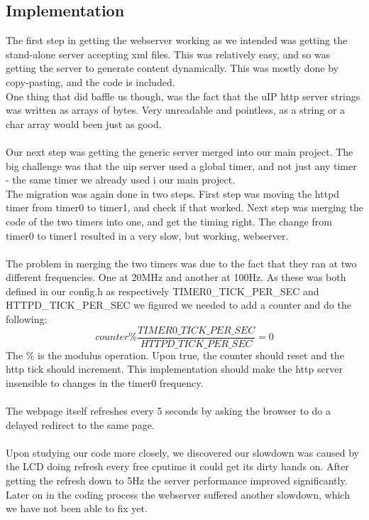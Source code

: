 {\subsection{Implementation}
The first step in getting the webserver working as we intended was getting the stand-alone server accepting xml files. This was relatively easy, and so was getting the server to generate content dynamically. This was mostly done by copy-pasting, and the code is included.\\
One thing that did baffle us though, was the fact that the uIP http server strings was written as arrays of bytes. Very unreadable and pointless, as a string or a char array would been just as good.\\\\
Our next step was getting the generic server merged into our main project. The big challenge was that the uip server used a global timer, and not just any timer - the same timer we already used i our main project.\\
The migration was again done in two steps. First step was moving the httpd timer from timer0 to timer1, and check if that worked. Next step was merging the code of the two timers into one, and get the timing right. The change from timer0 to timer1 resulted in a very slow, but working, webserver.\\\\
The problem in merging the two timers was due to the fact that they ran at two different frequencies. One at 20MHz and another at 100Hz. As these was both defined in our config.h as respectively TIMER0\_TICK\_PER\_SEC and HTTPD\_TICK\_PER\_SEC we figured we needed to add a counter and do the following:
\begin{equation}
  counter \% \frac{TIMER0\_TICK\_PER\_SEC}{HTTPD\_TICK\_PER\_SEC} = 0
\end{equation}
The \% is the modulus operation. Upon true, the counter should reset and the http tick should increment. This implementation should make the http server insensible to changes in the timer0 frequency.\\\\
The webpage itself refreshes every 5 seconds by asking the browser to do a delayed redirect to the same page.\\\\
Upon studying our code more closely, we discovered our slowdown was caused by the LCD doing refresh every free cputime it could get its dirty hands on. After getting the refresh down to 5Hz the server performance improved significantly. Later on in the coding process the webserver suffered another slowdown, which we have not been able to fix yet.

}
